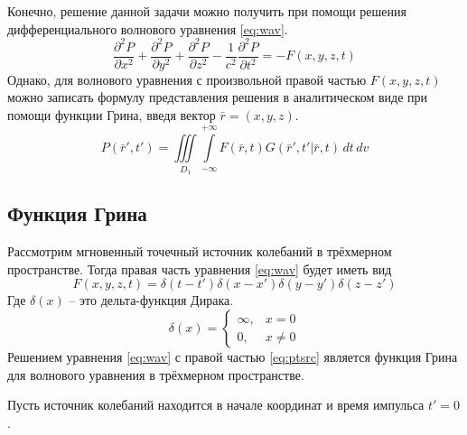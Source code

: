 \documentclass[a4paper, fontsize=14pt]{article}
\begin{document}
	Конечно, решение данной задачи можно получить при помощи решения
	дифференциального волнового уравнения \ref{eq:wav}. 
	\begin{equation}
		\frac{\partial^2 P}{\partial x^2} + \frac{\partial^2 P}{\partial y^2} +
		\frac{\partial^2 P}{\partial z^2} - \frac{1}{c^2} \frac{\partial^2 P}{\partial
			t^2} = -F(x,y,z,t)   
		\label{eq:wav}	
	\end{equation}
	Однако, для волнового уравнения с произвольной правой частью $F(x,y,z,t)$ можно
	записать формулу представления решения 
	в аналитическом виде при помощи функции Грина, введя вектор $\bar{r} = (x,y,z)$.
	\begin{equation}
		P(\bar{r}',t')=\iiint\limits_{D_1} \int\limits_{-\infty}^{+\infty}
		F(\bar{r},t) G(\bar{r}',t'|\bar{r},t)\,dt\,dv
	\end{equation}
	\subsection{Функция Грина} 
	
	Рассмотрим мгновенный точечный источник колебаний в трёхмерном пространстве.
	Тогда правая часть уравнения \ref{eq:wav} будет иметь вид \cite{zhdanov1988}
	\begin{equation}
		F(x,y,z,t) = \delta(t-t')\delta(x-x')\delta(y-y')\delta(z-z')
		\label{eq:ptsrc}
	\end{equation}
	Где $\delta(x)$ -- это дельта-функция Дирака.
	\begin{equation}
		\delta(x)=\begin{cases}
			\infty,&x=0\\
			0,&x\neq 0
		\end{cases}
		\label{eq:deltadef}
	\end{equation}	
	Решением уравнения \ref{eq:wav} с правой частью \ref{eq:ptsrc} является функция
	Грина для волнового уравнения в трёхмерном пространстве.
	
	Пусть источник колебаний находится в начале координат и время импульса $t' = 0$. 
	
\end{document}

